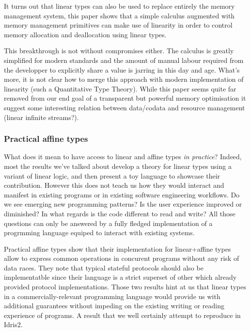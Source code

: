 \documentclass[
]{article}
\begin{document}
It turns out that linear types can also be used to replace entirely the
memory management system, this paper shows that a simple calculus
augmented with memory management primitives can make use of linearity in
order to control memory allocation and deallocation using linear types.

This breakthrough is not without compromises either. The calculus is
greatly simplified for modern standards and the amount of manual labour
required from the developper to explicitly share a value is jarring in
this day and age. What's more, it is not clear how to merge this
approach with modern implementation of linearity (such a Quantitative
Type Theory). While this paper seems quite far removed from our end goal
of a transparent but powerful memory optimisation it suggest some
interesting relation between data/codata and resource management (linear
infinite streams?).

\hypertarget{practical-affine-types}{%
\subsubsection{Practical affine types}\label{practical-affine-types}}

What does it mean to have access to linear and affine types \emph{in
practice}? Indeed, most the results we've talked about develop a theory
for linear types using a variant of linear logic, and then present a toy
language to showcase their contribution. However this does not teach us
how they would interact and manifest in existing programs or in existing
software engineering workflows. Do we see emerging new programming
patterns? Is the user experience improved or diminished? In what regards
is the code different to read and write? All those questions can only be
answered by a fully fledged implementation of a progrmming language
equiped to interact with existing systems.

Practical affine types show that their implementation for linear+affine
types allow to express common operations in concurent programs without
any risk of data races. They note that typical stateful protocols should
also be implementatble since their language is a strict superset of
other which already provided protocol implementations. Those two results
hint at us that linear types in a commercially-relevant programming
language would provide us with additional guarantees without impeding on
the existing writing or reading experience of programs. A result that we
well certainly attempt to reproduce in Idris2.
\end{document}
